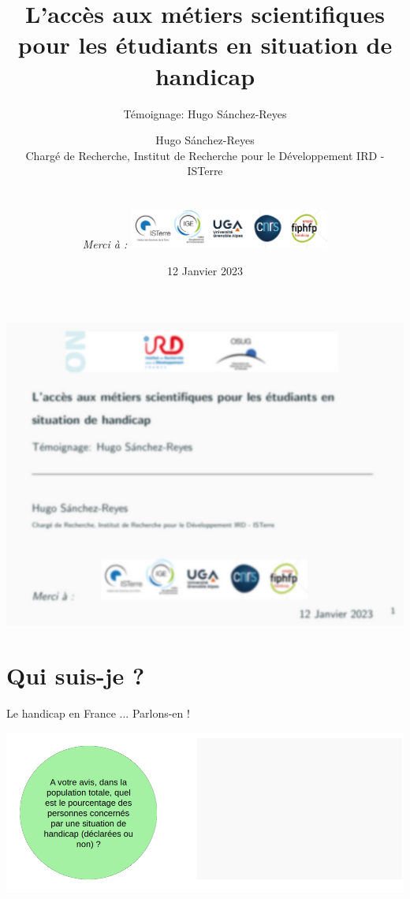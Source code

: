 \documentclass{beamer}
\title{{\normalsize \vskip 2cm 
L'accès aux
métiers scientifiques pour les
étudiants en situation de handicap}}
\subtitle{\small T\'emoignage: Hugo S\'anchez-Reyes}
\author{Hugo S\'anchez-Reyes \\ {\tiny Charg\'e de Recherche, Institut de Recherche pour le Développement IRD - ISTerre} \\ 
\\
\\
\textit{Merci à : \hspace{15pt}
\includegraphics[height=1.3cm]{../../logos/IRD-OSUG-ALL.png}\\}
}
\date[2021]{\vskip -0.5cm \hfill 12 Janvier 2023}
\begin{document}

\begin{frame}
\hskip -0.8cm \begin{minipage}{1\linewidth}
 \includegraphics[width=1.2\linewidth]{images/1st_slide_blur.png}  
\end{minipage}
\end{frame}


\begin{frame}
    \titlepage
\end{frame}


\section{Qui suis-je ?  }

\begin{frame}
 {Le handicap en France ... Parlons-en ! } 
 
 \includegraphics[width=1\linewidth]{images/handicap_cake0.png} 
 
\end{frame}
\end{document}
